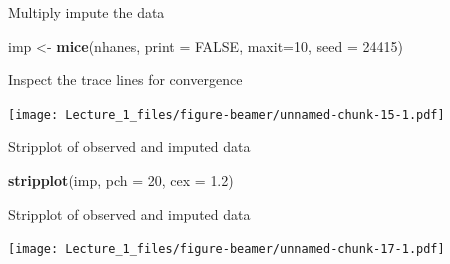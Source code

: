 \documentclass[ignorenonframetext,aspectratio=43]{beamer}
\newenvironment{Shaded}{\begin{snugshade}}{\end{snugshade}}
\newcommand{\DataTypeTok}[1]{\textcolor[rgb]{0.13,0.29,0.53}{#1}}
\newcommand{\DecValTok}[1]{\textcolor[rgb]{0.00,0.00,0.81}{#1}}
\newcommand{\FloatTok}[1]{\textcolor[rgb]{0.00,0.00,0.81}{#1}}
\newcommand{\KeywordTok}[1]{\textcolor[rgb]{0.13,0.29,0.53}{\textbf{#1}}}
\newcommand{\NormalTok}[1]{#1}
\newcommand{\OtherTok}[1]{\textcolor[rgb]{0.56,0.35,0.01}{#1}}
\newcommand{\StringTok}[1]{\textcolor[rgb]{0.31,0.60,0.02}{#1}}
\begin{document}
\begin{frame}[fragile]{Multiply impute the data}
\protect\hypertarget{multiply-impute-the-data}{}

\begin{Shaded}
\begin{Highlighting}[]
\NormalTok{imp <-}\StringTok{ }\KeywordTok{mice}\NormalTok{(nhanes, }\DataTypeTok{print =} \OtherTok{FALSE}\NormalTok{, }\DataTypeTok{maxit=}\DecValTok{10}\NormalTok{, }\DataTypeTok{seed =} \DecValTok{24415}\NormalTok{)}
\end{Highlighting}
\end{Shaded}

\end{frame}

\begin{frame}{Inspect the trace lines for convergence}
\protect\hypertarget{inspect-the-trace-lines-for-convergence}{}

\texttt{[image: Lecture\_1\_files/figure-beamer/unnamed-chunk-15-1.pdf]}

\end{frame}

\begin{frame}[fragile]{Stripplot of observed and imputed data}
\protect\hypertarget{stripplot-of-observed-and-imputed-data}{}

\begin{Shaded}
\begin{Highlighting}[]
\KeywordTok{stripplot}\NormalTok{(imp, }\DataTypeTok{pch =} \DecValTok{20}\NormalTok{, }\DataTypeTok{cex =} \FloatTok{1.2}\NormalTok{)}
\end{Highlighting}
\end{Shaded}

\end{frame}

\begin{frame}{Stripplot of observed and imputed data}
\protect\hypertarget{stripplot-of-observed-and-imputed-data-1}{}

\texttt{[image: Lecture\_1\_files/figure-beamer/unnamed-chunk-17-1.pdf]}

\end{frame}
\end{document}
